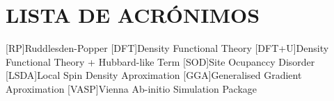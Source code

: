 
\chapter*{LISTA DE ACR\'ONIMOS}
\begin{acronym}
[RP]{Ruddlesden-Popper}
[DFT]{Density Functional Theory}%
[DFT+U]{Density Functional Theory + Hubbard-like Term}
[SOD]{Site Ocupanccy Disorder}%
[LSDA]{Local Spin Density Aproximation}%
[GGA]{Generalised Gradient Aproximation} %
[VASP]{Vienna Ab-initio Simulation Package}
\end{acronym}
\clearpage
